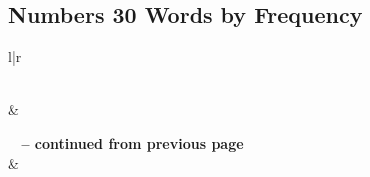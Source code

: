 

\subsection{Numbers 30 Words by Frequency}


\normalsize
 
\begin{center}
\begin{longtable}{l|r}
\caption[Numbers 30 Words by Frequency]{Numbers 30 Words by Frequency}\label{table:WordsbyFrequency for Numbers 30} \\
\hline {} &  \\ \hline 
\endfirsthead
 
{{\bfseries \tablename\ \thetable{} -- continued from previous page}} \\  
\hline {} &  \\ \hline 
\endhead
 

\end{longtable}
\end{center}
